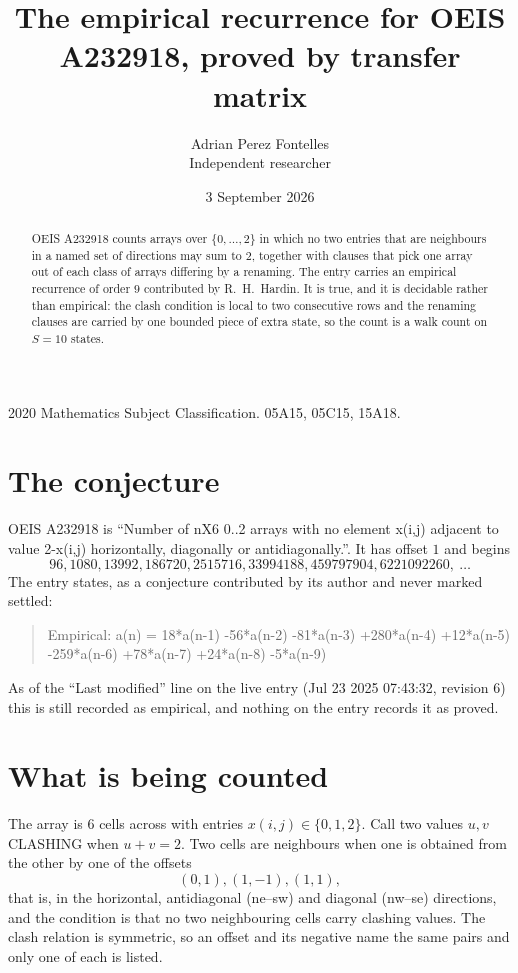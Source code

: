 \documentclass[11pt,a4paper]{article}
\title{The empirical recurrence for OEIS A232918, proved by transfer matrix}
\author{Adrian Perez Fontelles\\ \small Independent researcher}
\date{3 September 2026}
\theoremstyle{plain}
\theoremstyle{definition}
\begin{document}
\maketitle

\begin{abstract}
OEIS A232918 counts arrays over $\{0,\dots,2\}$ in which no two entries that are neighbours in
a named set of directions may sum to $2$, together with clauses that pick one array out of
each class of arrays differing by a renaming. The entry carries an empirical recurrence of
order $9$ contributed by R.~H.~Hardin. It is true, and it is decidable rather than
empirical: the clash condition is local to two consecutive rows and the renaming clauses are
carried by one bounded piece of extra state, so the count is a walk count on $S=10$ states.
\end{abstract}

\noindent\small 2020 Mathematics Subject Classification. 05A15, 05C15, 15A18.\normalsize

\section{The conjecture}

OEIS A232918 is ``Number of nX6 0..2 arrays with no element x(i,j) adjacent to value 2-x(i,j) horizontally, diagonally or antidiagonally.''. It has offset $1$ and begins
\[
96, 1080, 13992, 186720, 2515716, 33994188, 459797904, 6221092260,\ \dots
\]
The entry states, as a conjecture contributed by its author and never marked settled:
\begin{quote}
Empirical: a(n) = 18*a(n-1) -56*a(n-2) -81*a(n-3) +280*a(n-4) +12*a(n-5) -259*a(n-6) +78*a(n-7) +24*a(n-8) -5*a(n-9)
\end{quote}
As of the ``Last modified'' line on the live entry (Jul 23 2025 07:43:32, revision 6) this is still
recorded as empirical, and nothing on the entry records it as proved.

\section{What is being counted}

The array is $6$ cells across with entries $x(i,j)\in\{0,1,2\}$. Call two values $u,v$ CLASHING
when $u+v=2$. Two cells are neighbours when one is obtained from the other by one of
the offsets
\[
(0,1), (1,-1), (1,1),
\]
that is, in the horizontal, antidiagonal (ne--sw) and diagonal (nw--se) directions, and the condition is that no two neighbouring cells carry
clashing values. The clash relation is symmetric, so an offset and its negative name the
same pairs and only one of each is listed.
\end{document}
